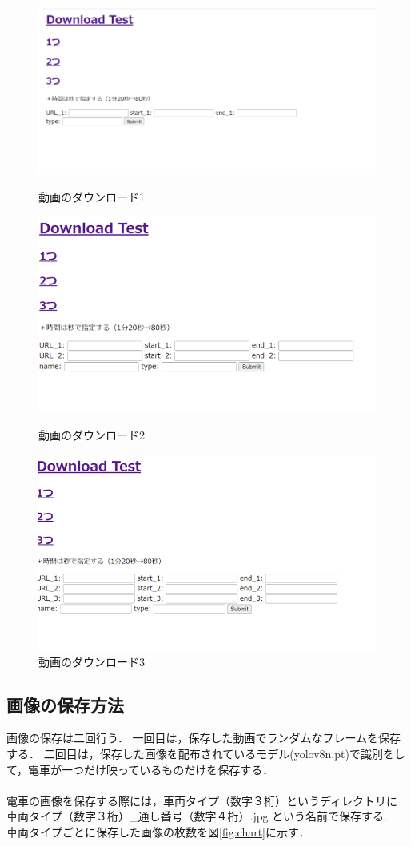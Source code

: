 \begin{figure}
	\centering
	\includegraphics [width=\linewidth]{chap3/fig/test1.png}
	\caption{動画のダウンロード1}
	\label{test1}

	
	\includegraphics [width=0.9\linewidth]{chap3/fig/test2.png}
	\caption{動画のダウンロード2}
	\label{test2}
	
	\includegraphics [width=0.9\linewidth]{chap3/fig/test3.png}
	\caption{動画のダウンロード3}
	\label{test3}
\end{figure}

\subsection{画像の保存方法}
画像の保存は二回行う．
一回目は，保存した動画でランダムなフレームを保存する．
二回目は，保存した画像を配布されているモデル(yolov8n.pt)で識別をして，電車が一つだけ映っているものだけを保存する．\\
\\
電車の画像を保存する際には，車両タイプ（数字３桁）というディレクトリに\\
車両タイプ（数字３桁）\_通し番号（数字４桁）.jpg    という名前で保存する.\\
車両タイプごとに保存した画像の枚数を図\ref{fig:chart}に示す．

